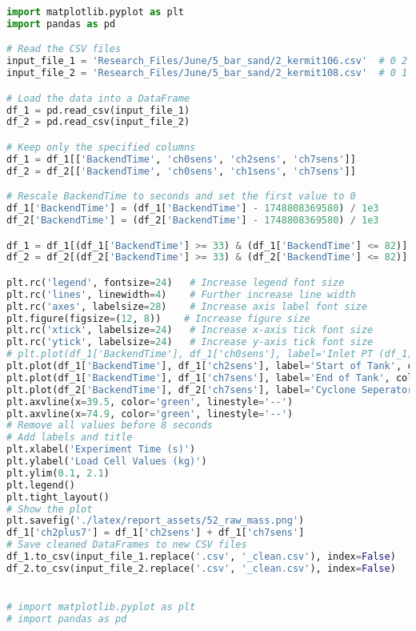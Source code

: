 \begin{lstlisting}[language=Python, caption={Example Python code for Mass Flow Analysis}]
import matplotlib.pyplot as plt
import pandas as pd

# Read the CSV files
input_file_1 = 'Research_Files/June/5_bar_sand/2_kermit106.csv'  # 0 2 7
input_file_2 = 'Research_Files/June/5_bar_sand/2_kermit108.csv'  # 0 1 7

# Load the data into a DataFrame
df_1 = pd.read_csv(input_file_1)
df_2 = pd.read_csv(input_file_2)

# Keep only the specified columns
df_1 = df_1[['BackendTime', 'ch0sens', 'ch2sens', 'ch7sens']]
df_2 = df_2[['BackendTime', 'ch0sens', 'ch1sens', 'ch7sens']]

# Rescale BackendTime to seconds and set the first value to 0
df_1['BackendTime'] = (df_1['BackendTime'] - 1748808369580) / 1e3
df_2['BackendTime'] = (df_2['BackendTime'] - 1748808369580) / 1e3

df_1 = df_1[(df_1['BackendTime'] >= 33) & (df_1['BackendTime'] <= 82)]
df_2 = df_2[(df_2['BackendTime'] >= 33) & (df_2['BackendTime'] <= 82)]

plt.rc('legend', fontsize=24)   # Increase legend font size
plt.rc('lines', linewidth=4)    # Further increase line width
plt.rc('axes', labelsize=28)    # Increase axis label font size
plt.figure(figsize=(12, 8))    # Increase figure size
plt.rc('xtick', labelsize=24)   # Increase x-axis tick font size
plt.rc('ytick', labelsize=24)   # Increase y-axis tick font size
# plt.plot(df_1['BackendTime'], df_1['ch0sens'], label='Inlet PT (df_1)') ### used to determine the opening and closing of the valves
plt.plot(df_1['BackendTime'], df_1['ch2sens'], label='Start of Tank', color='blue')
plt.plot(df_1['BackendTime'], df_1['ch7sens'], label='End of Tank', color='red')
plt.plot(df_2['BackendTime'], df_2['ch7sens'], label='Cyclone Seperator', color='orange')
plt.axvline(x=39.5, color='green', linestyle='--')
plt.axvline(x=74.9, color='green', linestyle='--')
# Remove all values before 8 seconds
# Add labels and title
plt.xlabel('Experiment Time (s)')
plt.ylabel('Load Cell Values (kg)')
plt.ylim(0.1, 2.1)
plt.legend()
plt.tight_layout()
# Show the plot
plt.savefig('./latex/report_assets/52_raw_mass.png')
df_1['ch2plus7'] = df_1['ch2sens'] + df_1['ch7sens']
# Save cleaned DataFrames to new CSV files
df_1.to_csv(input_file_1.replace('.csv', '_clean.csv'), index=False)
df_2.to_csv(input_file_2.replace('.csv', '_clean.csv'), index=False)


# import matplotlib.pyplot as plt
# import pandas as pd


\end{lstlisting}

